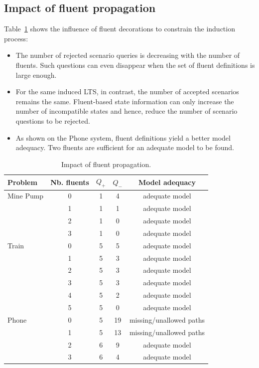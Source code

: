 
\subsection{Impact of fluent propagation}

Table~\ref{Fluents:res} shows the influence of fluent decorations to constrain the induction process:
\begin{itemize}
\item The number of rejected scenario queries is decreasing with the number of fluents. Such questions can even disappear when the set of fluent definitions is large enough. 
\item For the same induced LTS, in contrast, the number of accepted scenarios remains the same. Fluent-based state information can only increase the number of incompatible states and hence, reduce the number of scenario questions to be rejected.
\item As shown on the Phone system, fluent definitions yield a better model adequacy. Two fluents are sufficient for an adequate model to be found.
\end{itemize}

\begin{table}[H]
\centering
\begin{tabular}{|l||c||c|c|c|}\hline
Problem&Nb. fluents&$Q_+$&$Q_-$&Model adequacy\\\hline\hline
Mine Pump&0&1&4&adequate model\\\cline{2-5}
&1&1&1&adequate model\\\cline{2-5}
&2&1&0&adequate model\\\cline{2-5}
&3&1&0&adequate model\\\hline\hline
Train&0&5&5&adequate model\\\cline{2-5}
&1&5&3&adequate model\\\cline{2-5}
&2&5&3&adequate model\\\cline{2-5}
&3&5&3&adequate model\\\cline{2-5}
&4&5&2&adequate model\\\cline{2-5}
&5&5&0&adequate model\\\hline\hline
Phone&0&5&19&missing/unallowed paths\\\cline{2-5}
&1&5&13&missing/unallowed paths\\\cline{2-5}
&2&6&9&adequate model\\\cline{2-5}
&3&6&4&adequate model\\\hline
\end{tabular}
\caption{Impact of fluent propagation.\label{Fluents:res}}
\end{table}

